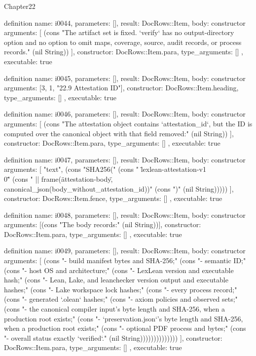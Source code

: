 \begin{lexlean}{Chapter22}
\begin{semanticmodule}
definition{
  name: i0044,
  parameters: [],
  result: DocRows::Item,
  body: constructor{
    arguments: [
      (cons "The artifact set is fixed. `verify` has no output-directory option and no option to omit maps, coverage, source, audit records, or process records." (nil String))
    ],
    constructor: DocRows::Item.para,
    type_arguments: []
  },
  executable: true
}

definition{
  name: i0045,
  parameters: [],
  result: DocRows::Item,
  body: constructor{
    arguments: [3, 1, "22.9 Attestation ID"],
    constructor: DocRows::Item.heading,
    type_arguments: []
  },
  executable: true
}

definition{
  name: i0046,
  parameters: [],
  result: DocRows::Item,
  body: constructor{
    arguments: [
      (cons "The attestation object contains `attestation_id`, but the ID is computed over the canonical object with that field removed:" (nil String))
    ],
    constructor: DocRows::Item.para,
    type_arguments: []
  },
  executable: true
}

definition{
  name: i0047,
  parameters: [],
  result: DocRows::Item,
  body: constructor{
    arguments: [
      "text",
      (cons "SHA256(" (cons "  \"lexlean-attestation-v1\\0\"" (cons "  || frame(\"attestation-body\", canonical_json(body_without_attestation_id))" (cons ")" (nil String)))))
    ],
    constructor: DocRows::Item.fence,
    type_arguments: []
  },
  executable: true
}

definition{
  name: i0048,
  parameters: [],
  result: DocRows::Item,
  body: constructor{
    arguments: [(cons "The body records:" (nil String))],
    constructor: DocRows::Item.para,
    type_arguments: []
  },
  executable: true
}

definition{
  name: i0049,
  parameters: [],
  result: DocRows::Item,
  body: constructor{
    arguments: [
      (cons "- build manifest bytes and SHA-256;" (cons "- semantic ID;" (cons "- host OS and architecture;" (cons "- LexLean version and executable hash;" (cons "- Lean, Lake, and leanchecker version output and executable hashes;" (cons "- Lake workspace lock hashes;" (cons "- every process record;" (cons "- generated `.olean` hashes;" (cons "- axiom policies and observed sets;" (cons "- the canonical compiler input's byte length and SHA-256, when a production root exists;" (cons "- `preservation.json`'s byte length and SHA-256, when a production root exists;" (cons "- optional PDF process and bytes;" (cons "- overall status exactly `verified`." (nil String))))))))))))))
    ],
    constructor: DocRows::Item.para,
    type_arguments: []
  },
  executable: true
}


\end{semanticmodule}
\end{lexlean}
